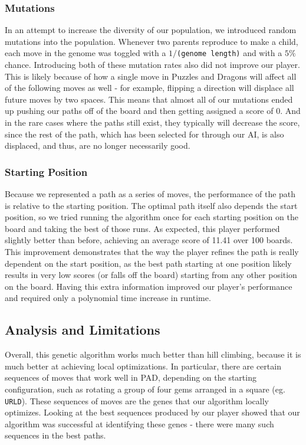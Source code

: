 \documentclass[journal,final,letterpaper,11pt]{IEEEtran}
\begin{document}
\subsubsection{Mutations} In an attempt to increase the diversity of our population, we introduced random mutations into the population. Whenever two parents reproduce to make a child, each move in the genome was toggled with a $1/$\verb+(genome length)+ and with a $5\%$ chance. Introducing both of these mutation rates also did not improve our player. This is likely because of how a single move in Puzzles and Dragons will affect all of the following moves as well - for example, flipping a direction will displace all future moves by two spaces. This means that almost all of our mutations ended up pushing our paths off of the board and then getting assigned a score of 0. And in the rare cases where the paths still exist, they typically will decrease the score, since the rest of the path, which has been selected for through our AI, is also displaced, and thus, are no longer necessarily good.

\subsubsection{Starting Position} Because we represented a path as a series of moves, the performance of the path is relative to the starting position. The optimal path itself also depends the start position, so we tried running the algorithm once for each starting position on the board and taking the best of those runs. As expected, this player performed slightly better than before, achieving an average score of 11.41 over 100 boards. This improvement demonstrates that the way the player refines the path is really dependent on the start position, as the best path starting at one position likely results in very low scores (or falls off the board) starting from any other position on the board. Having this extra information improved our player's performance and required only a polynomial time increase in runtime.

\subsection{Analysis and Limitations}
Overall, this genetic algorithm works much better than hill climbing, because it is much better at achieving local optimizations. In particular, there are certain sequences of moves that work well in PAD, depending on the starting configuration, such as rotating a group of four gems arranged in a square (eg. \verb+URLD+). These sequences of moves are the genes that our algorithm locally optimizes. Looking at the best sequences produced by our player showed that our algorithm was successful at identifying these genes - there were many such sequences in the best paths.
\end{document}
